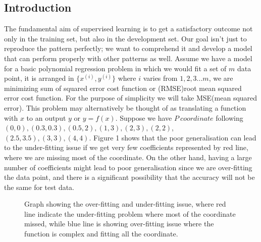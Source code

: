 \documentclass{article}
\begin{document}
\begin{multicols}{2}
\section{Introduction}
The fundamental aim of supervised learning is to get a satisfactory outcome not only in the training set, but also in the development set. Our goal isn't just to reproduce the pattern perfectly; we want to comprehend it and develop a model that can perform properly with other patterns as well\cite{7877209}. Assume we have a model for a basic polynomial regression problem in which we would fit a set of $m$ data point, it is arranged in $\{{x^{(i)},y^{(i)}}\}$ where $i$ varies from $1,2,3 ... m $, we are minimizing sum of squared error cost function or (RMSE)root mean squared error cost function. For the purpose of simplicity we will take MSE(mean squared error). This problem may alternatively be thought of as translating a function with $x$ to an output $y$ or $y=f(x)$. Suppose we have $P \ coordinate$ following $(0,0),(0.3,0.3),(0.5,2),(1,3),(2,3),(2,2)$, $(2.5,3.5),(3,3),(4,4)$. Figure 1 shows that the poor generalisation can lead to the under-fitting issue if we get very few coefficients represented by red line, where we are missing most of the coordinate. On the other hand, having a large number of coefficients might lead to poor generalisation since we are over-fitting the data point, and there is a significant possibility that the accuracy will not be the same for test data.
\begin{figure}[H]
\label{fig:1}
    \caption{Graph showing the over-fitting and under-fitting issue, where red line indicate the under-fitting problem where most of the coordinate missed, while blue line is showing over-fitting issue where the function is complex and fitting all the coordinate.}
  \end{figure}
  

\end{multicols}
\end{document}
